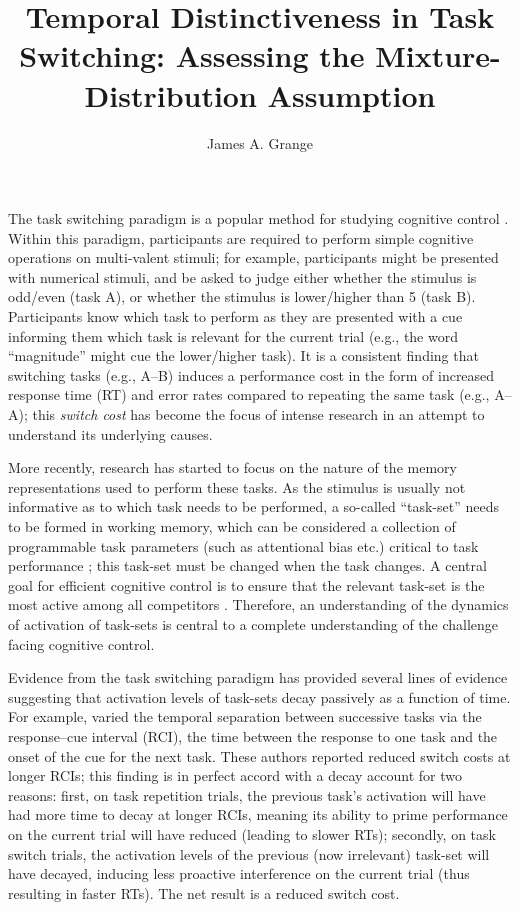 \documentclass[a4paper, jou, natbib]{apa6}
\title{Temporal Distinctiveness in Task Switching: Assessing the Mixture-Distribution Assumption}
\author{James A. Grange}
\affiliation{School of Psychology, Keele University, UK}
\begin{document}
\maketitle

The task switching paradigm is a popular method for studying cognitive control \citep{Grange2014a, Kiesel2010, Vandierendonck2010}. Within this paradigm, participants are required to perform simple cognitive operations on multi-valent stimuli; for example, participants might be presented with numerical stimuli, and be asked to judge either whether the stimulus is odd/even (task A), or whether the stimulus is lower/higher than 5 (task B). Participants know which task to perform as they are presented with a cue informing them which task is relevant for the current trial (e.g., the word ``magnitude'' might cue the lower/higher task). It is a consistent finding that switching tasks (e.g., A--B) induces a performance cost in the form of increased response time (RT) and error rates compared to repeating the same task (e.g., A--A); this \emph{switch cost} has become the focus of intense research in an attempt to understand its underlying causes. 

More recently, research has started to focus on the nature of the memory representations used to perform these tasks. As the stimulus is usually not informative as to which task needs to be performed, a so-called ``task-set'' needs to be formed in working memory, which can be considered a collection of programmable task parameters (such as attentional bias etc.) critical to task performance \citep{Logan2001}; this task-set must be changed when the task changes. A central goal for efficient cognitive control is to ensure that the relevant task-set is the most active among all competitors \citep[e.g.,][]{Altmann2008}. Therefore, an understanding of the dynamics of activation of task-sets is central to a complete understanding of the challenge facing cognitive control.

Evidence from the task switching paradigm has provided several lines of evidence suggesting that activation levels of task-sets decay passively as a function of time. For example, \cite{Meiran2000a} varied the temporal separation between successive tasks via the response--cue interval (RCI), the time between the response to one task and the onset of the cue for the next task. These authors reported reduced switch costs at longer RCIs; this finding is in perfect accord with a decay account for two reasons: first, on task repetition trials, the previous task's activation will have had more time to decay at longer RCIs, meaning its ability to prime performance on the current trial will have reduced (leading to slower RTs); secondly, on task switch trials, the activation levels of the previous (now irrelevant) task-set will have decayed, inducing less proactive interference on the current trial (thus resulting in faster RTs). The net result is a reduced switch cost.
\end{document}
